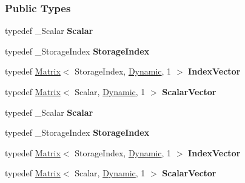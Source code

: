 \subsubsection*{Public Types}
\begin{DoxyCompactItemize}
\item 
\mbox{\label{group___sparse_l_u___module_a1c96dd142cf9bceec28f7ffedec30fe6}} 
typedef \+\_\+\+Scalar {\bfseries Scalar}
\item 
\mbox{\label{group___sparse_l_u___module_a76fd329b23f390646608265a60907913}} 
typedef \+\_\+\+Storage\+Index {\bfseries Storage\+Index}
\item 
\mbox{\label{group___sparse_l_u___module_a7607361d9fa602aefee60d2c8582f986}} 
typedef \hyperlink{group___core___module_class_eigen_1_1_matrix}{Matrix}$<$ Storage\+Index, \hyperlink{namespace_eigen_ad81fa7195215a0ce30017dfac309f0b2}{Dynamic}, 1 $>$ {\bfseries Index\+Vector}
\item 
\mbox{\label{group___sparse_l_u___module_ab2e273231613bd2ef35cac3e11a1234f}} 
typedef \hyperlink{group___core___module_class_eigen_1_1_matrix}{Matrix}$<$ Scalar, \hyperlink{namespace_eigen_ad81fa7195215a0ce30017dfac309f0b2}{Dynamic}, 1 $>$ {\bfseries Scalar\+Vector}
\item 
\mbox{\label{group___sparse_l_u___module_a1c96dd142cf9bceec28f7ffedec30fe6}} 
typedef \+\_\+\+Scalar {\bfseries Scalar}
\item 
\mbox{\label{group___sparse_l_u___module_a76fd329b23f390646608265a60907913}} 
typedef \+\_\+\+Storage\+Index {\bfseries Storage\+Index}
\item 
\mbox{\label{group___sparse_l_u___module_a7607361d9fa602aefee60d2c8582f986}} 
typedef \hyperlink{group___core___module_class_eigen_1_1_matrix}{Matrix}$<$ Storage\+Index, \hyperlink{namespace_eigen_ad81fa7195215a0ce30017dfac309f0b2}{Dynamic}, 1 $>$ {\bfseries Index\+Vector}
\item 
\mbox{\label{group___sparse_l_u___module_ab2e273231613bd2ef35cac3e11a1234f}} 
typedef \hyperlink{group___core___module_class_eigen_1_1_matrix}{Matrix}$<$ Scalar, \hyperlink{namespace_eigen_ad81fa7195215a0ce30017dfac309f0b2}{Dynamic}, 1 $>$ {\bfseries Scalar\+Vector}
\end{DoxyCompactItemize}
